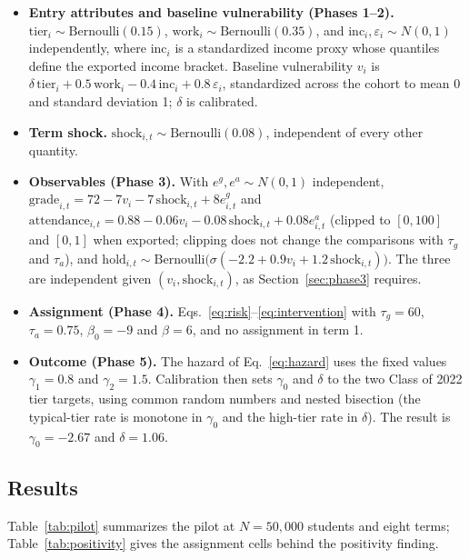 \documentclass[11pt]{article}
\begin{document}
\begin{itemize}
\item \textbf{Entry attributes and baseline vulnerability (Phases 1--2).} $\text{tier}_i \sim \text{Bernoulli}(0.15)$, $\text{work}_i \sim \text{Bernoulli}(0.35)$, and $\text{inc}_i, \varepsilon_i \sim N(0,1)$ independently, where $\text{inc}_i$ is a standardized income proxy whose quantiles define the exported income bracket. Baseline vulnerability $v_i$ is $\delta\,\text{tier}_i + 0.5\,\text{work}_i - 0.4\,\text{inc}_i + 0.8\,\varepsilon_i$, standardized across the cohort to mean 0 and standard deviation 1; $\delta$ is calibrated.
\item \textbf{Term shock.} $\text{shock}_{i,t} \sim \text{Bernoulli}(0.08)$, independent of every other quantity.
\item \textbf{Observables (Phase 3).} With $e^g, e^a \sim N(0,1)$ independent, $\text{grade}_{i,t} = 72 - 7v_i - 7\,\text{shock}_{i,t} + 8e^g_{i,t}$ and $\text{attendance}_{i,t} = 0.88 - 0.06v_i - 0.08\,\text{shock}_{i,t} + 0.08e^a_{i,t}$ (clipped to $[0,100]$ and $[0,1]$ when exported; clipping does not change the comparisons with $\tau_g$ and $\tau_a$), and $\text{hold}_{i,t} \sim \text{Bernoulli}\big(\sigma(-2.2 + 0.9v_i + 1.2\,\text{shock}_{i,t})\big)$. The three are independent given $(v_i, \text{shock}_{i,t})$, as Section~\ref{sec:phase3} requires.
\item \textbf{Assignment (Phase 4).} Eqs.~\ref{eq:risk}--\ref{eq:intervention} with $\tau_g = 60$, $\tau_a = 0.75$, $\beta_0 = -9$ and $\beta = 6$, and no assignment in term 1.
\item \textbf{Outcome (Phase 5).} The hazard of Eq.~\ref{eq:hazard} uses the fixed values $\gamma_1 = 0.8$ and $\gamma_2 = 1.5$. Calibration then sets $\gamma_0$ and $\delta$ to the two Class of 2022 tier targets, using common random numbers and nested bisection (the typical-tier rate is monotone in $\gamma_0$ and the high-tier rate in $\delta$). The result is $\gamma_0 = -2.67$ and $\delta = 1.06$.
\end{itemize}

\subsection{Results}

\hspace*{\parindent}Table~\ref{tab:pilot} summarizes the pilot at $N = 50{,}000$ students and eight terms; Table~\ref{tab:positivity} gives the assignment cells behind the positivity finding.
\end{document}

